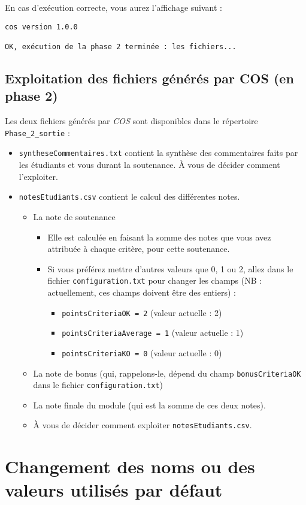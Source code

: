 \documentclass[11pt]{article}
\begin{document}
En cas d'exécution correcte, vous aurez l'affichage suivant :
\begin{verbatim}
cos version 1.0.0

OK, exécution de la phase 2 terminée : les fichiers...
\end{verbatim}
\subsection{Exploitation des fichiers générés par COS (en phase 2)}
\label{sec-6-3}
Les deux fichiers générés par \emph{COS} sont disponibles dans le
répertoire \verb~Phase_2_sortie~ :
\begin{itemize}
\item \verb~syntheseCommentaires.txt~ contient la synthèse des commentaires
faits par les étudiants et vous durant la soutenance. À vous de
décider comment l'exploiter.
\item \verb~notesEtudiants.csv~ contient le calcul des différentes notes.
\begin{itemize}
\item La note de soutenance
\begin{itemize}
\item Elle est calculée en faisant la somme des notes que vous avez
attribuée à chaque critère, pour cette soutenance.
\item Si vous préférez mettre d'autres valeurs que 0, 1 ou 2, allez
dans le fichier \verb~configuration.txt~ pour changer les champs
(NB : actuellement, ces champs doivent être des entiers) :
\begin{itemize}
\item \verb~pointsCriteriaOK = 2~ (valeur actuelle : 2)
\item \verb~pointsCriteriaAverage = 1~ (valeur actuelle : 1)
\item \verb~pointsCriteriaKO = 0~ (valeur actuelle : 0)
\end{itemize}
\end{itemize}
\item La note de bonus (qui, rappelons-le, dépend du champ
\verb~bonusCriteriaOK~ dans le fichier \verb~configuration.txt~)
\item La note finale du module (qui est la somme de ces deux notes).
\item À vous de décider comment exploiter \verb~notesEtudiants.csv~.
\end{itemize}
\end{itemize}
\section{Changement des noms ou des valeurs utilisés par défaut}
\label{sec-7}
\end{document}

